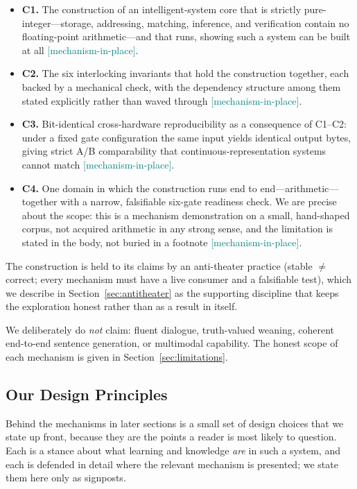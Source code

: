 \documentclass[11pt,a4paper]{article}
\newcommand{\statusmech}{\textcolor{teal}{\small\textsf{[mechanism-in-place]}}}
\begin{document}
\begin{itemize}[leftmargin=*]
\item \textbf{C1.} The construction of an intelligent-system core that is
strictly pure-integer---storage, addressing, matching, inference, and
verification contain no floating-point arithmetic---and that runs, showing
such a system can be built at all \statusmech.
\item \textbf{C2.} The six interlocking invariants that hold the
construction together, each backed by a mechanical check, with the
dependency structure among them stated explicitly rather than waved
through \statusmech.
\item \textbf{C3.} Bit-identical cross-hardware reproducibility as a
consequence of C1--C2: under a fixed gate configuration the same input
yields identical output bytes, giving strict A/B comparability that
continuous-representation systems cannot match \statusmech.
\item \textbf{C4.} One domain in which the construction runs end to
end---arithmetic---together with a narrow, falsifiable six-gate
readiness check. We are precise about the scope: this is a mechanism
demonstration on a small, hand-shaped corpus, not acquired arithmetic in
any strong sense, and the limitation is stated in the body, not buried
in a footnote \statusmech.
\end{itemize}

The construction is held to its claims by an anti-theater practice
(stable $\neq$ correct; every mechanism must have a live consumer and a
falsifiable test), which we describe in Section~\ref{sec:antitheater} as
the supporting discipline that keeps the exploration honest rather than
as a result in itself.

We deliberately do \emph{not} claim: fluent dialogue, truth-valued
weaning, coherent end-to-end sentence generation, or multimodal
capability. The honest scope of each mechanism is given in
Section~\ref{sec:limitations}.

\subsection{Our Design Principles}
\label{sec:intro-principles}

Behind the mechanisms in later sections is a small set of design choices
that we state up front, because they are the points a reader is most
likely to question. Each is a stance about what learning and knowledge
\emph{are} in such a system, and each is defended in detail where the
relevant mechanism is presented; we state them here only as signposts.
\end{document}
